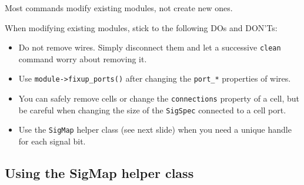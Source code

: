 \begin{frame}{\subsecname}
Most commands modify existing modules, not create new ones.

When modifying existing modules, stick to the following DOs and DON'Ts:

\begin{itemize}
\item Do not remove wires. Simply disconnect them and let a successive {\tt clean} command worry about removing it.

\item Use {\tt module->fixup\_ports()} after changing the {\tt port\_*} properties of wires.

\item You can safely remove cells or change the {\tt connections} property of a cell, but be careful when
changing the size of the {\tt SigSpec} connected to a cell port.

\item Use the {\tt SigMap} helper class (see next slide) when you need a unique handle for each signal bit.
\end{itemize}
\end{frame}


\subsection{Using the SigMap helper class}

